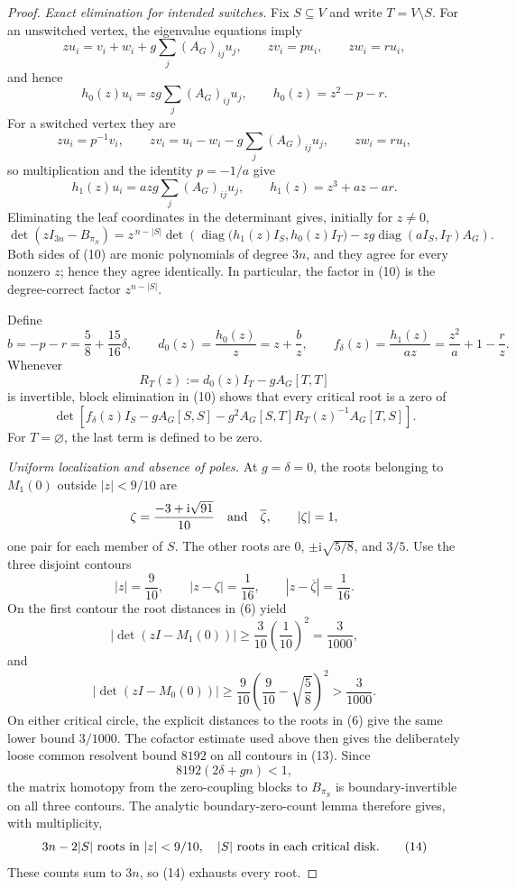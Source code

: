 \documentclass{article}
\begin{document}
\begin{proof}
\emph{Exact elimination for intended switches.}
Fix \(S\subseteq V\) and write \(T=V\setminus S\). For an unswitched vertex, the eigenvalue equations imply
\[
 zu_i=v_i+w_i+g\sum_j(A_G)_{ij}u_j,\qquad
 zv_i=pu_i,\qquad zw_i=ru_i,
\]
and hence
\[
 h_0(z)u_i=zg\sum_j(A_G)_{ij}u_j,
 \qquad h_0(z)=z^2-p-r.
\tag{8}
\]
For a switched vertex they are
\[
 zu_i=p^{-1}v_i,\qquad
 zv_i=u_i-w_i-g\sum_j(A_G)_{ij}u_j,\qquad
 zw_i=ru_i,
\]
so multiplication and the identity \(p=-1/a\) give
\[
 h_1(z)u_i=azg\sum_j(A_G)_{ij}u_j,
 \qquad h_1(z)=z^3+az-ar.
\tag{9}
\]
Eliminating the leaf coordinates in the determinant gives, initially for \(z\neq0\),
\[
 \det(zI_{3n}-B_{\pi_S})
 =z^{\,n-|S|}
   \det\!\left(
      \operatorname{diag}\bigl(h_1(z)I_S,h_0(z)I_T\bigr)
      -zg\operatorname{diag}(aI_S,I_T)A_G
   \right).
\tag{10}
\]
Both sides of (10) are monic polynomials of degree \(3n\), and they agree for every nonzero \(z\); hence they agree identically. In particular, the factor in (10) is the degree-correct factor \(z^{n-|S|}\).

Define
\[
 b=-p-r=\frac58+\frac{15}{16}\delta,\qquad
 d_0(z)=\frac{h_0(z)}z=z+\frac bz,\qquad
 f_\delta(z)=\frac{h_1(z)}{az}=\frac{z^2}{a}+1-\frac rz.
\tag{11}
\]
Whenever
\[
 R_T(z):=d_0(z)I_T-gA_G[T,T]
\]
is invertible, block elimination in (10) shows that every critical root is a zero of
\[
 \det\!\left[
 f_\delta(z)I_S-gA_G[S,S]
 -g^2A_G[S,T]R_T(z)^{-1}A_G[T,S]
 \right].
\tag{12}
\]
For \(T=\varnothing\), the last term is defined to be zero.

\emph{Uniform localization and absence of poles.}
At \(g=\delta=0\), the roots belonging to \(M_1(0)\) outside \(|z|<9/10\) are
\[
 \zeta=\frac{-3+\mathrm i\sqrt{91}}{10}
 \quad\hbox{and}\quad \overline\zeta,
 \qquad |\zeta|=1,
\]
one pair for each member of \(S\). The other roots are \(0\), \(\pm\mathrm i\sqrt{5/8}\), and \(3/5\). Use the three disjoint contours
\[
 |z|=\frac9{10},\qquad |z-\zeta|=\frac1{16},\qquad
 |z-\overline\zeta|=\frac1{16}.
\tag{13}
\]
On the first contour the root distances in (6) yield
\[
 |\det(zI-M_1(0))|\geq\frac3{10}\left(\frac1{10}\right)^2
 =\frac3{1000},
\]
and
\[
 |\det(zI-M_0(0))|
 \geq\frac9{10}\left(\frac9{10}-\sqrt{\frac58}\right)^2
 >\frac3{1000}.
\]
On either critical circle, the explicit distances to the roots in (6) give the same lower bound \(3/1000\). The cofactor estimate used above then gives the deliberately loose common resolvent bound \(8192\) on all contours in (13). Since
\[
 8192(2\delta+gn)<1,
\]
the matrix homotopy from the zero-coupling blocks to \(B_{\pi_S}\) is boundary-invertible on all three contours. The analytic boundary-zero-count lemma therefore gives, with multiplicity,
\[
 3n-2|S|\ \hbox{roots in }|z|<9/10,
\quad |S|\ \hbox{roots in each critical disk}.
\tag{14}
\]
These counts sum to \(3n\), so (14) exhausts every root.


\end{proof}
\end{document}

